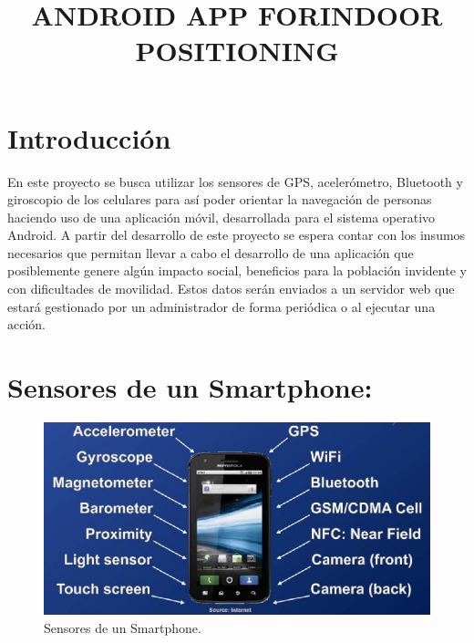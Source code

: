 \documentclass[conference,compsoc,onecolumn]{IEEEtran}
\begin{document}
\title {ANDROID APP FORINDOOR POSITIONING}
\author{
\and
	}


\maketitle
\IEEEoverridecommandlockouts
\IEEEpeerreviewmaketitle


\section{Introducción}
En este proyecto se busca utilizar los sensores de GPS, acelerómetro, Bluetooth y giroscopio de los celulares para así poder orientar la navegación de personas haciendo uso de una aplicación móvil, desarrollada para el sistema operativo Android. A partir del desarrollo de este proyecto se espera contar con los insumos necesarios que permitan llevar a cabo el desarrollo de una aplicación que posiblemente genere algún impacto social, beneficios para la población invidente y con dificultades de movilidad. Estos datos serán enviados a un servidor web que estará gestionado por un administrador de forma periódica o al ejecutar una acción.


\section{Sensores de un Smartphone:}


\begin{figure}[H]
\centering
\includegraphics[keepaspectratio, scale=1]{Imagenes/Imagen1.jpg}
\caption{Sensores de un Smartphone.}
\end{figure}
\end{document}

